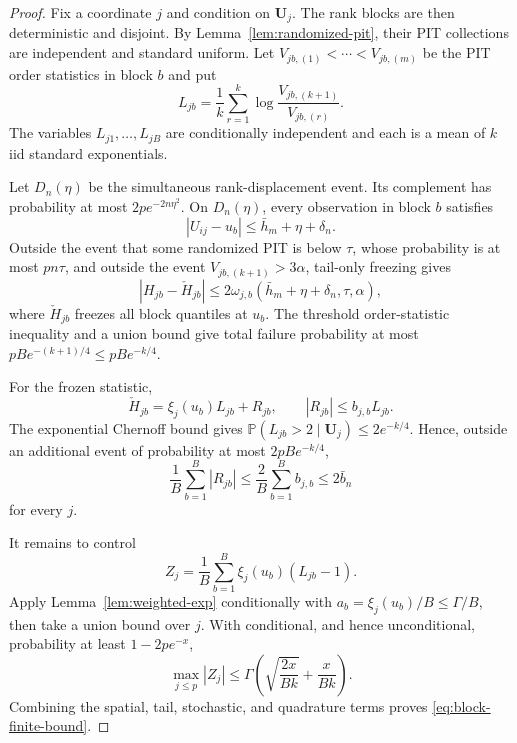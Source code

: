 \documentclass[11pt]{article}
\theoremstyle{definition}\newtheorem{definition}[theorem]{Definition}
\newcommand{\Pp}{\mathbb P}
\begin{document}
\begin{proof}
Fix a coordinate $j$ and condition on $\bm U_j$.  The rank blocks are then
deterministic and disjoint.  By Lemma~\ref{lem:randomized-pit}, their PIT
collections are independent and standard uniform.  Let
$V_{jb,(1)}<\cdots<V_{jb,(m)}$ be the PIT order statistics in block $b$ and
put
\[
 L_{jb}=\frac1k\sum_{r=1}^k
 \log\frac{V_{jb,(k+1)}}{V_{jb,(r)}}.
\]
The variables $L_{j1},\ldots,L_{jB}$ are conditionally independent and each
is a mean of $k$ iid standard exponentials.

Let $D_n(\eta)$ be the simultaneous rank-displacement event.  Its complement
has probability at most $2pe^{-2n\eta^2}$.  On $D_n(\eta)$, every observation
in block $b$ satisfies
\[
 |U_{ij}-u_b|\le\bar h_m+\eta+\delta_n.
\]
Outside the event that some randomized PIT is below $\tau$, whose probability
is at most $pn\tau$, and outside the event
$V_{jb,(k+1)}>3\alpha$, tail-only freezing gives
\[
 |H_{jb}-\check H_{jb}|
 \le2\omega_{j,b}(\bar h_m+\eta+\delta_n,\tau,\alpha),
\]
where $\check H_{jb}$ freezes all block quantiles at $u_b$.  The threshold
order-statistic inequality and a union bound give total failure probability
at most $pB e^{-(k+1)/4}\le pBe^{-k/4}$.

For the frozen statistic,
\[
 \check H_{jb}=\xi_j(u_b)L_{jb}+R_{jb},
 \qquad
 |R_{jb}|\le b_{j,b}L_{jb}.
\]
The exponential Chernoff bound gives
$\Pp(L_{jb}>2\mid\bm U_j)\le2e^{-k/4}$.  Hence, outside an additional event
of probability at most $2pBe^{-k/4}$,
\[
 \frac1B\sum_{b=1}^B|R_{jb}|
 \le\frac2B\sum_{b=1}^Bb_{j,b}\le2\bar b_n
\]
for every $j$.

It remains to control
\[
 Z_j=\frac1B\sum_{b=1}^B
 \xi_j(u_b)(L_{jb}-1).
\]
Apply Lemma~\ref{lem:weighted-exp} conditionally with
$a_b=\xi_j(u_b)/B\le\Gamma/B$, then take a union bound over $j$.  With
conditional, and hence unconditional, probability at least $1-2pe^{-x}$,
\[
 \max_{j\le p}|Z_j|
 \le\Gamma\left(\sqrt{\frac{2x}{Bk}}+\frac{x}{Bk}\right).
\]
Combining the spatial, tail, stochastic, and quadrature terms proves
\eqref{eq:block-finite-bound}.
\end{proof}
\end{document}
